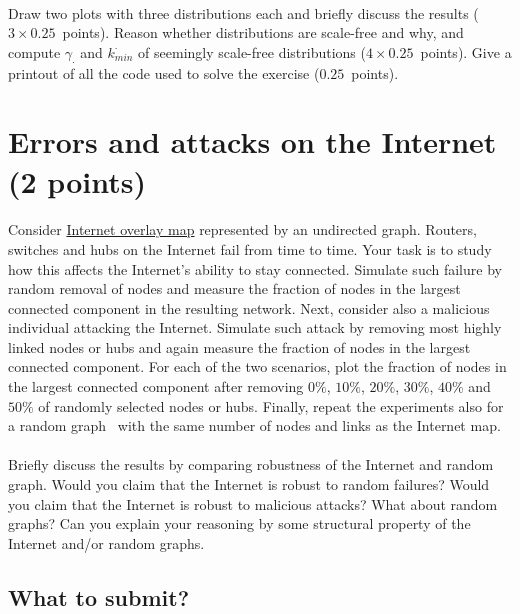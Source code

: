 \documentclass[11pt,a4paper]{article}
\newcommand{\points}[1]{({\color{magenta}$#1$~points})}
\newcommand{\totals}[1]{({\color{magenta}#1 points})}
\begin{document}
\paragraph{} Draw two plots with three distributions each and briefly discuss the results \points{3\times 0.25}. Reason whether distributions are scale-free and why, and compute $\gamma_{\cdot}$ and $k^{\cdot}_{min}$ of seemingly scale-free distributions \points{4\times 0.25}. Give a printout of all the code used to solve the exercise \points{0.25}.

\section{Errors and attacks on the Internet \totals{2}}

\paragraph{} Consider \href{http://lovro.lpt.fri.uni-lj.si/ina/nets/nec}{Internet overlay map} represented by an undirected graph. Routers, switches and hubs on the Internet fail from time to time. Your task is to study how this affects the Internet's ability to stay connected. Simulate such failure by random removal of nodes and measure the fraction of nodes in the largest connected component in the resulting network. Next, consider also a malicious individual attacking the Internet. Simulate such attack by removing most highly linked nodes or hubs and again measure the fraction of nodes in the largest connected component. For each of the two scenarios, plot the fraction of nodes in the largest connected component after removing $0\%$, $10\%$, $20\%$, $30\%$, $40\%$ and $50\%$ of randomly selected nodes or hubs. Finally, repeat the experiments also for a random graph~\cite{ER59} with the same number of nodes and links as the Internet map. 

\paragraph{} Briefly discuss the results by comparing robustness of the Internet and random graph. Would you claim that the Internet is robust to random failures? Would you claim that the Internet is robust to malicious attacks? What about random graphs? Can you explain your reasoning by some structural property of the Internet and/or random graphs.

\subsection*{What to submit?}
\end{document}
